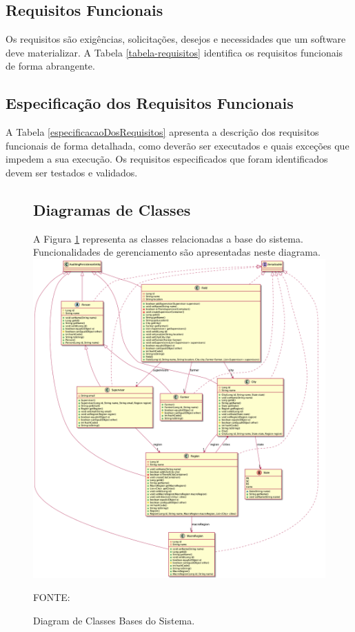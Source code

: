 \subsection{Requisitos Funcionais}
Os requisitos são exigências, solicitações, desejos e necessidades que um software deve materializar. A Tabela \ref{tabela-requisitos} identifica os requisitos funcionais de forma abrangente.  



\subsection{Especificação dos Requisitos Funcionais}

A Tabela \ref{especificacaoDosRequisitos} apresenta a descrição dos requisitos funcionais de forma detalhada, como deverão ser executados e quais exceções que impedem a sua execução. Os requisitos especificados que foram identificados devem ser testados e validados. 



 

\begin{figure}[!h]

\subsection{Diagramas de Classes}

A Figura \ref{domain-base} representa as classes relacionadas a base do sistema. Funcionalidades de gerenciamento são apresentadas neste diagrama.
	\includegraphics[scale=0.35]{dados/figuras/domain-base-classes.png}
	\caption{Diagram de Classes Bases do Sistema.}
	FONTE: \cite[https:~//github.com/gabrielcostasilva/emater-mip-datacollection-app/tree/DDDLike/mip/src/main/resources/UMLDiagrams]{gabriel}
	\label{domain-base}
\end{figure}


